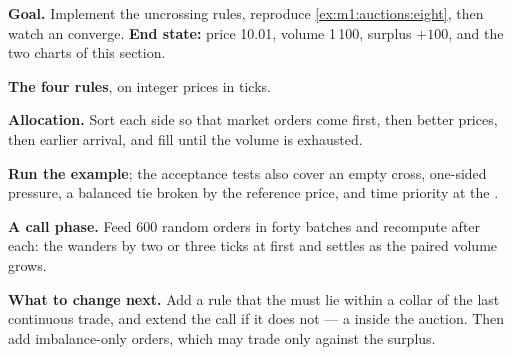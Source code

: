 \begin{tutorial}
\textbf{Goal.} Implement the uncrossing rules, reproduce
\cref{ex:m1:auctions:eight}, then watch an  converge.
\textbf{End state:} price 10.01, volume 1\,100, surplus $+100$, and the two
charts of this section.
\begin{tutsteps}
\item \textbf{The four rules}, on integer prices in ticks.
\label{lst:m1:auctions:uncross}
\item \textbf{Allocation.} Sort each side so that market orders come first,
then better prices, then earlier arrival, and fill until the volume is
exhausted.
\label{lst:m1:auctions:allocate}
\item \textbf{Run the example}; the acceptance tests also cover an empty
cross, one-sided pressure, a balanced tie broken by the reference price, and
time priority at the .
\item \textbf{A call phase.} Feed 600 random orders in forty batches and
recompute after each: the  wanders by two or three ticks at
first and settles as the paired volume grows.
\end{tutsteps}
\textbf{What to change next.} Add a rule that the  must lie
within a collar of the last continuous trade, and extend the call if it does
not --- a  inside the auction. Then add imbalance-only
orders, which may trade only against the surplus.
\end{tutorial}

